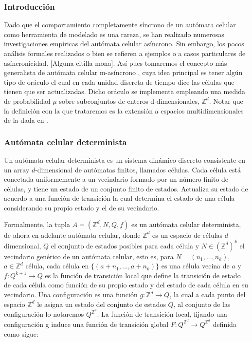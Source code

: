 \documentclass[../proyecto.tex]{memoir}
\begin{document}
\subsubsection{Introducción}
Dado que el comportamiento completamente síncrono de un autómata celular como herramienta de modelado es una rareza, se han realizado numerosas investigaciones empíricas del autómata celular asíncrono. Sin embargo, los pocos análisis formales realizados o bien se refieren a ejemplos o a casos particulares de asíncronicidad. [Alguna citilla mona]. Así pues tomaremos el concepto más generalista de autómata celular m-asíncrono \cite{oraculo}, cuya idea principal es tener algún tipo de oráculo el cual en cada unidad discreta de tiempo dice las células que tienen que ser actualizadas. Dicho oráculo se implementa empleando una medida de probabilidad $\mu$ sobre subconjuntos de enteros d-dimensionales, $\mathds{Z}^{d}$. Notar que la definición con la que trataremos es la extensión a espacios multidimensionales de la dada en \cite{oraculo}.

\subsubsection{Autómata celular determinista}
Un autómata celular determinista es un sistema dinámico discreto consistente en un array $d$-dimensional de autómatas finitos, llamados células. Cada célula está conectada uniformemente a un vecindario formado por un número finito de células, y tiene un estado de un conjunto finito de estados. Actualiza su estado de acuerdo a una función de transición la cual determina el estado de una célula considerando su propio estado y el de su vecindario. 

Formalmente, la tupla $A=(\mathds{Z}^{d}, N, Q, f)$ es un autómata celular determinista, de ahora en adelante autómata celular, donde $\mathds{Z} ^{d}$ es un espacio de células $d$-dimensional, $Q$ el conjunto de estados posibles para cada célula y $N \in (\mathds{Z}^{d})^{k}$ el vecindario genérico de un autómata celular, esto es, para $N=(n_{1},...,n_{k})$, $a \in \mathds{Z} ^{d}$ célula, cada célula en $\{(a+n_{1},...,a+n_{k})\}$ es una célula vecina de $a$ y $f:Q^{k+1} \rightarrow Q$ es la función de transición local que define la transición de estado de cada célula como función de su propio estado y del estado de cada célula en su vecindario. Una configuración es una función $g: \mathds{Z}^{d} \rightarrow Q$, la cual a cada punto del espacio $\mathds{Z}^{d}$ le asigna un estado del conjunto de estados $Q$, al conjunto de las configuración lo notaremos $Q^{\mathds{Z}^{d}}$. La función de transición local, fijando una configuración g induce una función de transición global $F:Q^{\mathds{Z}^{d}} \rightarrow Q^{\mathds{Z}^{d}}$ definida como sigue:
\end{document}
